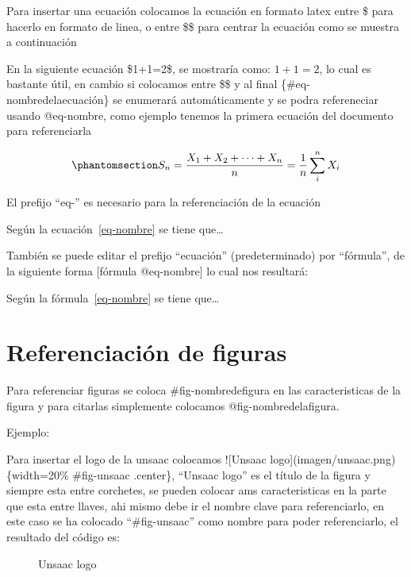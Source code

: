 \documentclass[
  12pt,
  letterpaper,
]{scrreprt}
\begin{document}
Para insertar una ecuación colocamos la ecuación en formato latex entre
\$ para hacerlo en formato de linea, o entre \$\$ para centrar la
ecuación como se muestra a continuación

En la siguiente ecuación \$1+1=2\$, se mostraría como: \(1+1=2\), lo
cual es bastante útil, en cambio si colocamos entre \$\$ y al final
\{\#eq-nombredelaecuación\} se enumerará automáticamente y se podra
refereneciar usando @eq-nombre, como ejemplo tenemos la primera ecuación
del documento para referenciarla

\begin{equation}\phantomsection\label{eq-nombre}{
S_n = \frac{X_1 + X_2 + \cdots + X_n}{n}
      = \frac{1}{n}\sum_{i}^{n} X_i
}\end{equation}

El prefijo ``eq-'' es necesario para la referenciación de la ecuación

Según la ecuación~\ref{eq-nombre} se tiene que\ldots{}

También se puede editar el prefijo ``ecuación'' (predeterminado) por
``fórmula'', de la siguiente forma {[}fórmula @eq-nombre{]} lo cual nos
resultará:

Según la fórmula~\ref{eq-nombre} se tiene que\ldots{}

\section{Referenciación de figuras}\label{referenciaciuxf3n-de-figuras}

Para referenciar figuras se coloca \#fig-nombredefigura en las
caracteristicas de la figura y para citarlas simplemente colocamos
@fig-nombredelafigura.

Ejemplo:

Para insertar el logo de la unsaac colocamos !{[}Unsaac
logo{]}(imagen/unsaac.png)\{width=20\% \#fig-unsaac .center\}, ``Unsaac
logo'' es el título de la figura y siempre esta entre corchetes, se
pueden colocar ams caracteristicas en la parte que esta entre llaves,
ahi mismo debe ir el nombre clave para referenciarlo, en este caso se ha
colocado ``\#fig-unsaac'' como nombre para poder referenciarlo, el
resultado del código es:

\begin{figure}

\caption{\label{fig-unsaac}Unsaac logo}


\end{figure}%
\end{document}
